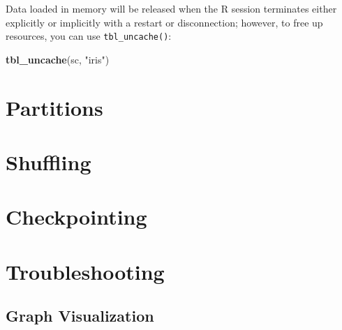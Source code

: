 \documentclass[]{book}
\newenvironment{Shaded}{\begin{snugshade}}{\end{snugshade}}
\newcommand{\KeywordTok}[1]{\textcolor[rgb]{0.13,0.29,0.53}{\textbf{#1}}}
\newcommand{\NormalTok}[1]{#1}
\newcommand{\StringTok}[1]{\textcolor[rgb]{0.31,0.60,0.02}{#1}}
\theoremstyle{definition}
\theoremstyle{definition}
\theoremstyle{definition}
\theoremstyle{remark}
\begin{document}
Data loaded in memory will be released when the R session terminates
either explicitly or implicitly with a restart or disconnection;
however, to free up resources, you can use \texttt{tbl\_uncache()}:

\begin{Shaded}
\begin{Highlighting}[]
\KeywordTok{tbl_uncache}\NormalTok{(sc, }\StringTok{"iris"}\NormalTok{)}
\end{Highlighting}
\end{Shaded}

\hypertarget{partitions}{%
\section{Partitions}\label{partitions}}

\hypertarget{shuffling}{%
\section{Shuffling}\label{shuffling}}

\hypertarget{checkpointing}{%
\section{Checkpointing}\label{checkpointing}}

\hypertarget{troubleshooting-1}{%
\section{Troubleshooting}\label{troubleshooting-1}}

\hypertarget{graph-visualization}{%
\subsection{Graph Visualization}\label{graph-visualization}}
\end{document}
